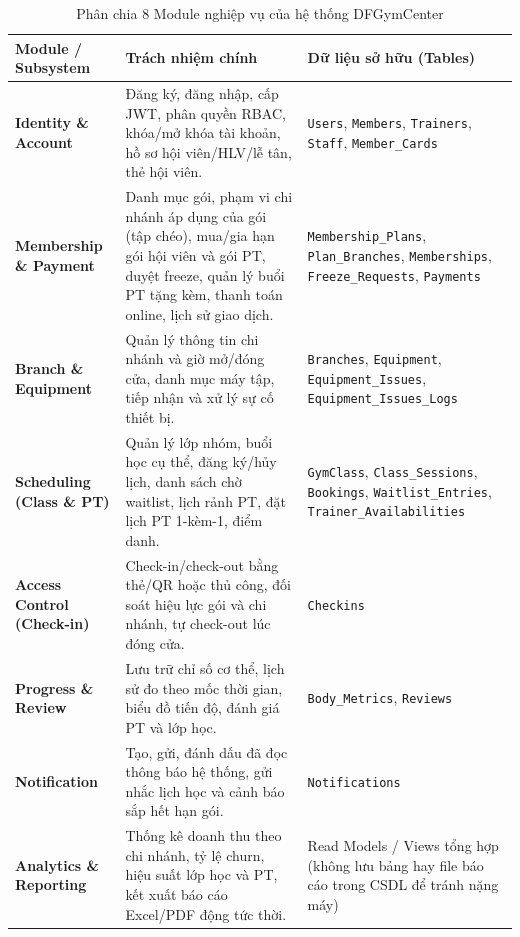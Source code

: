 \documentclass[a4paper,12pt]{article}
\begin{document}
\begin{table}[H]
\centering
\begin{tabularx}{\textwidth}{|L{4.2cm}|Y|L{4.2cm}|}
\hline
\textbf{Module / Subsystem} & \textbf{Trách nhiệm chính} & \textbf{Dữ liệu sở hữu (Tables)} \\ \hline
\textbf{Identity \& Account} & Đăng ký, đăng nhập, cấp JWT, phân quyền RBAC, khóa/mở khóa tài khoản, hồ sơ hội viên/HLV/lễ tân, thẻ hội viên. & \texttt{Users}, \texttt{Members}, \texttt{Trainers}, \texttt{Staff}, \texttt{Member\_Cards} \\ \hline
\textbf{Membership \& Payment} & Danh mục gói, phạm vi chi nhánh áp dụng của gói (tập chéo), mua/gia hạn gói hội viên và gói PT, duyệt freeze, quản lý buổi PT tặng kèm, thanh toán online, lịch sử giao dịch. & \texttt{Membership\_Plans}, \texttt{Plan\_Branches}, \texttt{Memberships}, \texttt{Freeze\_Requests}, \texttt{Payments} \\ \hline
\textbf{Branch \& Equipment} & Quản lý thông tin chi nhánh và giờ mở/đóng cửa, danh mục máy tập, tiếp nhận và xử lý sự cố thiết bị. & \texttt{Branches}, \texttt{Equipment}, \texttt{Equipment\_Issues}, \texttt{Equipment\_Issues\_Logs} \\ \hline
\textbf{Scheduling (Class \& PT)} & Quản lý lớp nhóm, buổi học cụ thể, đăng ký/hủy lịch, danh sách chờ waitlist, lịch rảnh PT, đặt lịch PT 1-kèm-1, điểm danh. & \texttt{GymClass}, \texttt{Class\_Sessions}, \texttt{Bookings}, \texttt{Waitlist\_Entries}, \texttt{Trainer\_Availabilities} \\ \hline
\textbf{Access Control (Check-in)} & Check-in/check-out bằng thẻ/QR hoặc thủ công, đối soát hiệu lực gói và chi nhánh, tự check-out lúc đóng cửa. & \texttt{Checkins} \\ \hline
\textbf{Progress \& Review} & Lưu trữ chỉ số cơ thể, lịch sử đo theo mốc thời gian, biểu đồ tiến độ, đánh giá PT và lớp học. & \texttt{Body\_Metrics}, \texttt{Reviews} \\ \hline
\textbf{Notification} & Tạo, gửi, đánh dấu đã đọc thông báo hệ thống, gửi nhắc lịch học và cảnh báo sắp hết hạn gói. & \texttt{Notifications} \\ \hline
\textbf{Analytics \& Reporting} & Thống kê doanh thu theo chi nhánh, tỷ lệ churn, hiệu suất lớp học và PT, kết xuất báo cáo Excel/PDF động tức thời. & Read Models / Views tổng hợp (không lưu bảng hay file báo cáo trong CSDL để tránh nặng máy) \\ \hline
\end{tabularx}
\caption{Phân chia 8 Module nghiệp vụ của hệ thống DFGymCenter}
\end{table}
\end{document}
